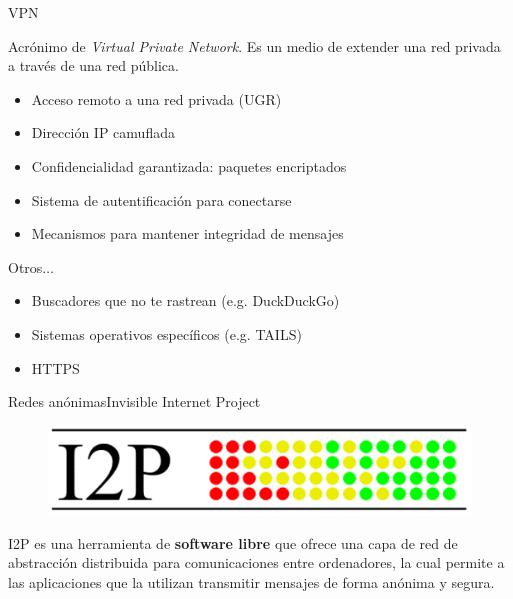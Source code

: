 \documentclass[spanish]{beamer}
\begin{document}
\begin{frame}{VPN}

Acrónimo de \textit{Virtual Private Network}. Es un medio de extender una red privada a través de una red pública.

\vspace{1.9em}

\begin{itemize}
	\item Acceso remoto a una red privada (UGR) \\
	\item Dirección IP camuflada \\ 
	\item Confidencialidad garantizada: paquetes encriptados \\
	\item Sistema de autentificación para conectarse
	\item Mecanismos para mantener integridad de mensajes
\end{itemize}	

\end{frame}



\begin{frame}{Otros$\dots$}

\begin{itemize}
	\item Buscadores que no te rastrean (e.g. DuckDuckGo)
	\item Sistemas operativos específicos (e.g. TAILS)
    \item HTTPS
\end{itemize}

\end{frame}



\begin{frame}{Redes anónimas}{Invisible Internet Project}
	\vspace{-1em}
	
	\begin{figure}
	\centering
	\includegraphics[width=.5\textwidth]{img/i2p_logo}
\end{figure}
I2P es una herramienta de \textbf{software libre} que ofrece una capa de red de abstracción distribuida para comunicaciones entre ordenadores, la cual permite a las aplicaciones que la utilizan transmitir mensajes de forma anónima y segura.
	
\end{frame}
\end{document}
